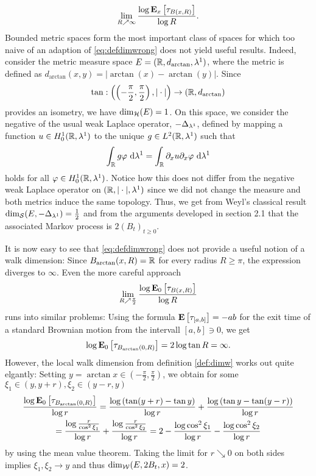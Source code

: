 \begin{equation}\label{eq:defdimwrong}
  \lim_{R\nearrow\infty}\frac{\log \PTEp{\tau_{B(x,R)}}{x}}{\log R}.
\end{equation}
Bounded metric spaces form the most important class of spaces for which too naive of an adaption of \eqref{eq:defdimwrong} does not yield useful results. Indeed, consider the metric measure space 
$E=(\IR,d_{\arctan},\gl^1)$, where the metric is defined as $d_{\arctan}(x,y)=|\arctan(x)-\arctan(y)|$. Since 
\[
  \tan:\left(\left(-\frac{\pi}{2},\frac{\pi}{2}\right),|\cdot|\right)\to(\IR,d_{\arctan}) 
\]
provides an isometry, we have $\dimh(E)=1$. On this space, we consider the negative of the usual weak Laplace operator, $-\gD_{\gl^1}$, defined by mapping a function $u\in H_0^1(\IR,\gl^1)$ to the unique $g\in L^2(\IR,\gl^1)$ such that
\[
  \int_\IR g\gp\,\Di\gl^1=\int_\IR \partial_x u\partial_x \gp\,\Di\gl^1
\]
holds for all $\gp\in H_0^1(\IR,\gl^1)$. Notice how this does not differ from the negative weak Laplace operator on $(\IR,|\cdot|,\gl^1)$ since we did not change the measure and both metrics induce the same topology. Thus, we get from Weyl's classical result $\dims(E,-\gD_{\gl^1})=\frac{1}{2}$ and from the arguments developed in section 2.1 that the associated Markov process is $2(B_t)_{t\geq0}$. 

It is now easy to see that \eqref{eq:defdimwrong} does not provide a useful notion of a walk dimension: Since $B_{\arctan}(x,R)=\IR$ for every radius $R\geq\pi$, the expression diverges to $\infty$. Even the more careful approach 
\[
  \lim_{R\nearrow\frac{\pi}{2}}\frac{\log \PTEp{\tau_{B(x,R)}}{0}}{\log R}
\]
runs into similar problems: Using the formula $\PTE{\tau_{[a,b]}}=-ab$ for the exit time of a standard Brownian motion from the intervall $[a,b]\ni 0$, we get
\[
  \log \PTEp{\tau_{B_{\arctan}(0,R)}}{0}=2\log \tan R =\infty.
\]
However, the local walk dimension from definition \ref{def:dimw} works out quite elgantly: Setting $y=\arctan x\in\left(-\frac{\pi}{2},\frac{\pi}{2}\right)$, we obtain for some $\xi_1\in (y,y+r),\xi_2\in(y-r,y)$
\begin{multline*}
  \frac{\log \PTEp{\tau_{B_{\arctan}(0,R)}}{0}}{\log r}
  =\frac{\log\left(\tan(y+r)-\tan y\right)}{\log r}+\frac{\log\left(\tan y-\tan (y-r)\right)}{\log r}\\
  =\frac{\log\frac{r}{\cos^2 \xi_1}}{\log r}+\frac{\log\frac{r}{\cos^2 \xi_2}}{\log r}
  =2-\frac{\log \cos^2 \xi_1}{\log r}-\frac{\log\cos^2 \xi_2}{\log r}
\end{multline*}
by using the mean value theorem. Taking the limit for $r\searrow0$ on both sides implies $\xi_1,\xi_2\to y$ and thus $\dimw(E,2B_t,x)=2$. 







